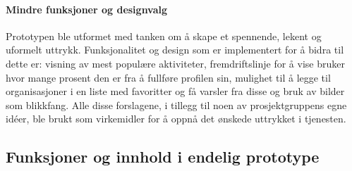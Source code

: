 \paragraph{Mindre funksjoner og designvalg}
Prototypen ble utformet med tanken om å skape et spennende, lekent og uformelt uttrykk. Funksjonalitet og design som er implementert for å bidra til dette er: visning av mest populære aktiviteter, fremdriftslinje for å vise bruker hvor mange prosent den er fra å fullføre profilen sin, mulighet til å legge til organisasjoner i en liste med favoritter og få varsler fra disse og bruk av bilder som blikkfang. Alle disse forslagene, i tillegg til noen av prosjektgruppens egne idéer, ble brukt som virkemidler for å oppnå det ønskede uttrykket i tjenesten.

\subsection{Funksjoner og innhold i endelig prototype}



